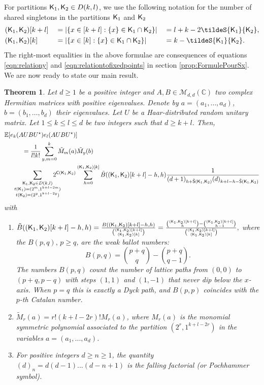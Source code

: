 \documentclass[11pt, a4paper, oneside, reqno]{amsart}
\newcommand{\sK}{{\sf K}}
\newcommand{\partitionskl}{{D(k,l)}}
\newtheorem{theorem}{Theorem}
\theoremstyle{remark}
\theoremstyle{definition}
\numberwithin{equation}{section}
\begin{document}
For partitions $\sK_1, \sK_2 \in \partitionskl$, we use the following notation for the number of shared singletons in the partitions ${\sf K}_1$ and ${\sf K}_2$
\begin{align*}
	 & (\sK_1, \sK_2 )[k+l]  &&= |\{ x \in [k+l]:\{x\} \in \sK_1\cap \sK_2\}| && = l+k - 2\tildeS{\sK_1}{\sK_2}, \\
	 & (\sK_1,\sK_2 )[k]  &&= |\{ x \in [k]:\{x\} \in \sK_1\cap \sK_2\}| &&= k - \tildeS{\sK_1}{\sK_2}.
\end{align*}
The right-most equalities in the above formulae are consequences of equations \eqref{eqn:relationy} and \eqref{eqn:relationtofixedpoints} in section \ref{prop:FormulePourSx}. We are now ready to state our main result.
\begin{theorem}\label{thm:MainTheorem}
Let $d\geq 1$ be a positive integer and $A,B \in \mathcal{M}_{d,d}(\mathbb{C})$ two complex Hermitian matrices with positive eigenvalues. Denote by $a = (a_1,\ldots,a_d)$, $b=(b_1,\ldots,b_d)$ their eigenvalues. Let $U$ be a Haar-distributed random unitary matrix. Let $1 \leq k\leq l \leq d$ be two integers such that $d \geq k+l$. Then,
\begin{align*}
	 & \mathbb{E}[e_k(AUBU^{\star})e_l(AUBU^{\star})]                      \\
	 & \hspace{1cm}=\frac{1}{l!k!}\sum_{y,m = 0}^{k} \tilde{M}_m(a)\tilde{M}_y(b)  \\
	 & \hspace{0.5cm}\sum_{\substack{\sK_1, \sK_2\in \partitionskl                              \\ {t({\sK}_1)}=(2^m,1^{k+l-2m}) \\ {t({\sf K}_2)}=(2^y,1^{k+l-2y})}}\hspace{-0.5cm}{2^{{\sf C}(\sK_1,\sK_2)}}\sum_{h = 0}^{(\sK_1,\sK_2 )[k]}\tilde{B}((\sK_1,\sK_2)[k+l]-h,h) \frac{1}{(d+1)_{h+ {\tilde{\sf S}}(\sK_1,\sK_2)}(d)_{k+l-h-{\tilde{\sf S}}(\sK_1,\sK_2)}}
\end{align*}
with
\begin{enumerate}
    \item $
\tilde{B}((\sK_1,\sK_2)[k+l]-h,h)=\frac{B((\sK_1,\sK_2)[k+l]-h,h)}{\binom{(\sK_1,\sK_2)[k+l]}{(\sK_1,\sK_2)[k]}}=\frac{\binom{(\sK_1,\sK_2)[k+l]}{h}-\binom{(\sK_1,\sK_2)[k+l]}{h-1}}{\binom{(\sK_1,\sK_2)[k+l]}{(\sK_1,\sK_2)[k]}},
$
where the ${B}(p,q),\, p \geq q $, are the \emph{weak ballot numbers}:
$$
B(p,q) = \binom{p+q}{q}-\binom{p+q}{q-1}.
$$ 
The numbers $B(p,q)$ count the number of lattice paths from  $(0,0)$ to $(p+q,p-q)$ with steps $(1,1)$ and $(1,-1)$ that never dip below the $x$-axis. When $p=q$ this is exactly a Dyck path, and $B(p,p)$ coincides with the $p$-th Catalan number.
\item $\tilde{M}_r(a) = r!(k+l-2r)! M_r(a)$, where $M_r(a)$ is the monomial symmetric polynomial associated to the partition $(2^r, 1^{k+l-2r})$ in the variables $a = (a_1,...,a_d)$.
\item For positive integers $d \geq n \geq 1$, the quantity $(d)_n = d(d-1)...(d-n+1)$ is the \emph{falling factorial} (or \emph{Pochhammer symbol}).

\end{enumerate}

\end{theorem}
\end{document}

